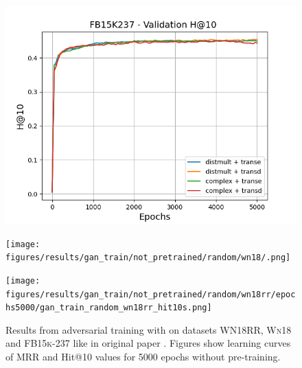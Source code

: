 \begin{figure}
    \begin{minipage}{.3\textwidth}
      \centering
      \includegraphics[width=\linewidth]{figures/results/gan_train/not_pretrained/random/fb15k237/epochs5000/gan_train_random_fb15k237_hit10s.png}
    \end{minipage}%
     \begin{minipage}{.3\textwidth}
      \centering
      \texttt{[image: figures/results/gan\_train/not\_pretrained/random/wn18/.png]}
    \end{minipage}%
     \begin{minipage}{.3\textwidth}
      \centering
      \texttt{[image: figures/results/gan\_train/not\_pretrained/random/wn18rr/epochs5000/gan\_train\_random\_wn18rr\_hit10s.png]}
    \end{minipage}%
    \caption{Results from adversarial training with \origsampling on datasets \textsc{WN18RR}, \textsc{Wn18} and \textsc{FB15k-237} like in original \kbgan paper \cite{cai2017kbgan}.
    Figures show learning curves of MRR and Hit@10 values for 5000 epochs without pre-training.}
    \label{fig:gan_train_not_pretrained_random}
\end{figure}